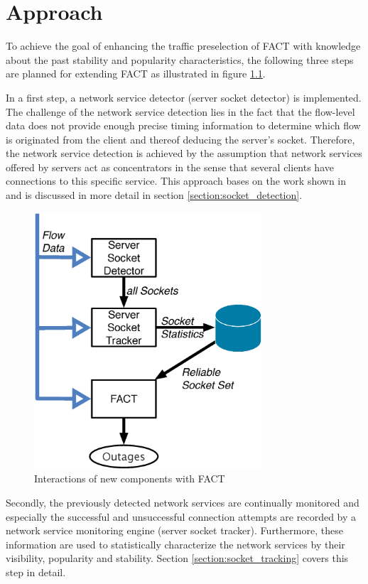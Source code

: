 

\chapter{Approach
\label{chapter:approach}}

To achieve the goal of enhancing the traffic preselection of \gls{FACT} with knowledge about the past stability and popularity characteristics, the following three steps are planned for extending \gls{FACT} as illustrated in figure  \ref{fig:FACT}.

In a first step, a network service detector (server socket detector) is  implemented. The challenge of the network service detection lies in the fact  that the flow-level data does not provide enough precise timing information to  determine which flow is originated from the client and thereof deducing the server's socket\citep{Trammell}. Therefore, the network service detection is achieved by the assumption that network services offered by servers act as concentrators in the sense that several clients have connections to this specific service. This approach bases on the work shown in \cite{Schatzmann:Dissection, Schatzmann:Mining, Schatzmann:Tracing} and is discussed in more detail in section \ref{section:socket_detection}.

\begin{figure}
	[t] \centering
	\includegraphics[width=8.5cm]{images/Approach_blockdiagram.eps}
	\caption{Interactions of new components with \gls{FACT}} 
	\label{fig:FACT} 
\end{figure}

Secondly, the previously detected network services are continually monitored and especially the successful and unsuccessful connection attempts are recorded by a network service monitoring engine (server socket tracker). Furthermore, these information are used to statistically characterize the network services by their visibility, popularity and stability. Section \ref{section:socket_tracking} covers this step in detail.

